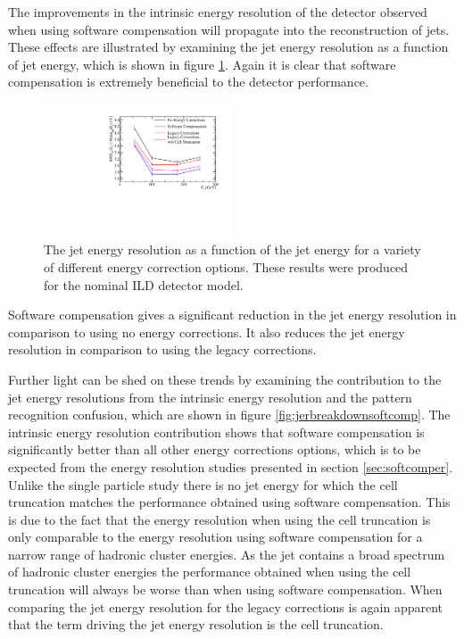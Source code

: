 The improvements in the intrinsic energy resolution of the detector observed when using software compensation will propagate into the reconstruction of jets.  These effects are illustrated by examining the jet energy resolution as a function of jet energy, which is shown in figure \ref{fig:jersoftcomp}.  Again it is clear that software compensation is extremely beneficial to the detector performance.  

\begin{figure}
\includegraphics[width=0.5\textwidth]{EnergyEstimators/Plots/SoftComp/JetEnergyResolution/JER_vs_JetEnergy_Default.pdf}
\caption[The jet energy resolution as a function of the jet energy for a variety of different energy correction options.  These results were produced for the nominal ILD detector model.]{The jet energy resolution as a function of the jet energy for a variety of different energy correction options.  These results were produced for the nominal ILD detector model.}
\label{fig:jersoftcomp}
\end{figure}

Software compensation gives a significant reduction in the jet energy resolution in comparison to using no energy corrections.  It also reduces the jet energy resolution in comparison to using the legacy corrections.  

Further light can be shed on these trends by examining the contribution to the jet energy resolutions from the intrinsic energy resolution and the pattern recognition confusion, which are shown in figure \ref{fig:jerbreakdownsoftcomp}.  The intrinsic energy resolution contribution shows that software compensation is significantly better than all other energy corrections options, which is to be expected from the energy resolution studies presented in section \ref{sec:softcomper}.  Unlike the single particle study there is no jet energy for which the cell truncation matches the performance obtained using software compensation.  This is due to the fact that the energy resolution when using the cell truncation is only comparable to the energy resolution using software compensation for a narrow range of hadronic cluster energies.  As the jet contains a broad spectrum of hadronic cluster energies the performance obtained when using the cell truncation will always be worse than when using software compensation.  When comparing the jet energy resolution for the legacy corrections is again apparent that the term driving the jet energy resolution is the cell truncation.

